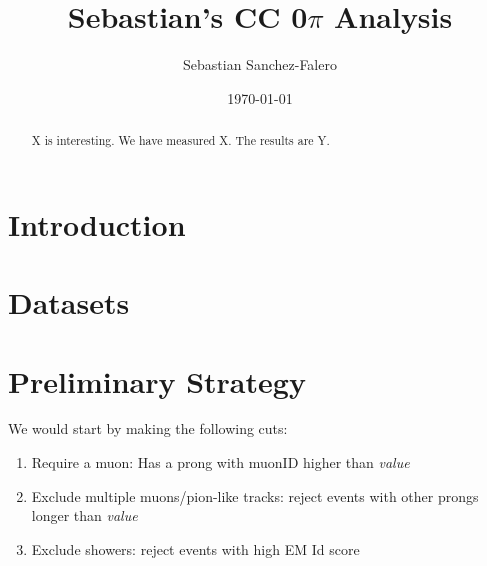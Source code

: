 \documentclass[11pt]{article}
\title{Sebastian's \numu CC 0$\pi$ Analysis}%
\author{Sebastian Sanchez-Falero}
\date{\today}%
\begin{document}
\linenumbers
\maketitle

\begin{abstract}
X is interesting.  We have measured X.  The results are Y.
\end{abstract}


\section{Introduction}





\section{Datasets}






\section{Preliminary Strategy}
We would start by making the following cuts:

\begin{enumerate}
   	\item Require a muon: Has a prong with muonID higher than \textit{value}
       \item Exclude multiple muons/pion-like tracks: reject events with other prongs longer than \textit{value}
       \item Exclude showers: reject events with high EM Id score
\end{enumerate}



\end{document}
